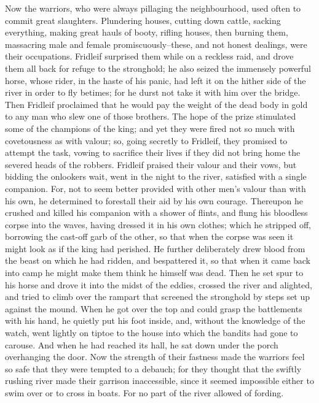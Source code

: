 \documentclass[10pt,a4paper]{report}
\begin{document}
Now the warriors, who were always pillaging the neighbourhood, used often to commit great slaughters. Plundering houses, cutting down cattle, sacking everything, making great hauls of booty, rifling houses, then burning them, massacring male and female promiscuously--these, and not honest dealings, were their occupations. Fridleif surprised them while on a reckless raid, and drove them all back for refuge to the stronghold; he also seized the immensely powerful horse, whose rider, in the haste of his panic, had left it on the hither side of the river in order to fly betimes; for he durst not take it with him over the bridge. Then Fridleif proclaimed that he would pay the weight of the dead body in gold to any man who slew one of those brothers. The hope of the prize stimulated some of the champions of the king; and yet they were fired not so much with covetousness as with valour; so, going secretly to Fridleif, they promised to attempt the task, vowing to sacrifice their lives if they did not bring home the severed heads of the robbers. Fridleif praised their valour and their vows, but bidding the onlookers wait, went in the night to the river, satisfied with a single companion. For, not to seem better provided with other men's valour than with his own, he determined to forestall their aid by his own courage. Thereupon he crushed and killed his companion with a shower of flints, and flung his bloodless corpse into the waves, having dressed it in his own clothes; which he stripped off, borrowing the cast-off garb of the other, so that when the corpse was seen it might look as if the king had perished. He further deliberately drew blood from the beast on which he had ridden, and bespattered it, so that when it came back into camp he might make them think he himself was dead. Then he set spur to his horse and drove it into the midst of the eddies, crossed the river and alighted, and tried to climb over the rampart that screened the stronghold by steps set up against the mound. When he got over the top and could grasp the battlements with his hand, he quietly put his foot inside, and, without the knowledge of the watch, went lightly on tiptoe to the house into which the bandits had gone to carouse. And when he had reached its hall, he sat down under the porch overhanging the door. Now the strength of their fastness made the warriors feel so safe that they were tempted to a debauch; for they thought that the swiftly rushing river made their garrison inaccessible, since it seemed impossible either to swim over or to cross in boats. For no part of the river allowed of fording.\\
\end{document}
